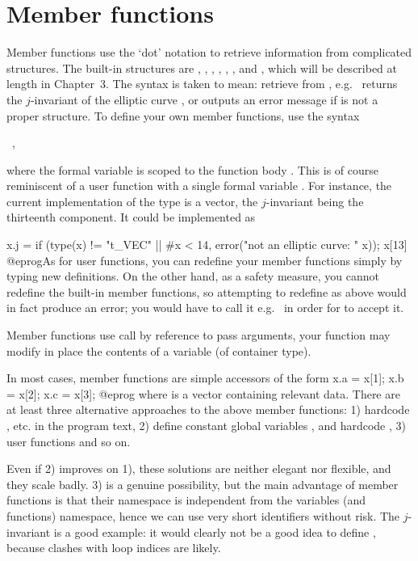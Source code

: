 \section{Member functions} \label{se:member}

Member functions use the `dot' notation to retrieve information from
complicated structures. The built-in structures are , ,
, , , ,  and , which
will be described at length in Chapter~3. The syntax 
is taken to mean: retrieve  from ,
e.g.~ returns the $j$-invariant of the elliptic curve ,
or outputs an error message if  is not a proper  structure.
To define your own member functions, use the syntax

\ ,

\noindent where the formal variable  is scoped to the function
body . This is of course reminiscent of a user function with a
single formal variable . For instance, the current implementation of
the  type is a vector, the $j$-invariant being the thirteenth
component. It could be implemented as

\bprog
x.j =
{
  if (type(x) != "t_VEC" || #x < 14, error("not an elliptic curve: " x));
  x[13]
}
@eprog\noindent As for user functions, you can redefine your member functions
simply by typing new definitions. On the other hand, as a safety measure, you
cannot redefine the built-in member functions, so attempting to redefine
 as above would in fact produce an error; you would have to call it
e.g.~ in order for  to accept it.

Member functions use call by reference to pass arguments, your function
may modify in place the contents of a variable (of container type).

 In most cases, member functions are simple accessors
of the form
\bprog
  x.a = x[1];
  x.b = x[2];
  x.c = x[3];
@eprog\noindent
where  is a vector containing relevant data. There are at least
three alternative approaches to the above member functions: 1) hardcode
, etc. in the program text, 2) define constant global variables
,   and hardcode , 3)
user functions  and so on.

Even if 2) improves on 1), these solutions are neither elegant nor flexible,
and they scale badly. 3) is a genuine possibility, but the main advantage of
member functions is that their namespace is independent from the variables
(and functions) namespace, hence we can use very short identifiers without
risk. The $j$-invariant is a good example: it would clearly not be a good
idea to define , because clashes with loop indices are
likely.

